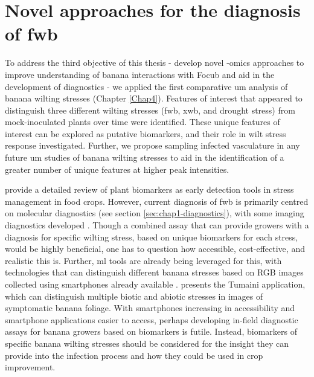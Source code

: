 \section{Novel approaches for the diagnosis of \acl{fwb}}

To address the third objective of this thesis - develop novel -omics approaches to improve understanding of banana interactions with \ac{Focub} and aid in the development of diagnostics - we applied the first comparative \acf{um} analysis of banana wilting stresses (Chapter \ref{Chap4}). Features of interest that appeared to distinguish three different wilting stresses (\acf{fwb}, \acf{xwb}, and drought stress) from mock-inoculated plants over time were identified. These unique features of interest can be explored as putative biomarkers, and their role in wilt stress response investigated. Further, we propose sampling infected vasculature in any future \ac{um} studies of banana wilting stresses to aid in the identification of a greater number of unique features at higher peak intensities. 

\textcite{Aina2024} provide a detailed review of plant biomarkers as early detection tools in stress management in food crops. However, current diagnosis of \ac{fwb} is primarily centred on molecular diagnostics (see section \ref{sec:chap1-diagnostics}), with some imaging diagnostics developed \parencite{Ye2020a, Ye2020b, Selvaraj2019b, Zhang2022}. Though a combined assay that can provide growers with a diagnosis for specific wilting stress, based on unique biomarkers for each stress, would be highly beneficial, one has to question how accessible, cost-effective, and realistic this is. Further, \ac{ml} tools are already being leveraged for this, with technologies that can distinguish different banana stresses based on RGB images collected using smartphones already available \parencite{Aasha2024}. \textcite{Selvaraj2019b} presents the Tumaini application, which can distinguish multiple biotic and abiotic stresses in images of symptomatic banana foliage. With smartphones increasing in accessibility and smartphone applications easier to access, perhaps developing in-field diagnostic assays for banana growers based on biomarkers is futile. Instead, biomarkers of specific banana wilting stresses should be considered for the insight they can provide into the infection process and how they could be used in crop improvement. 

